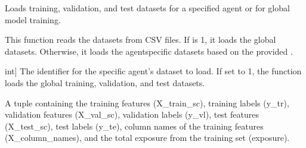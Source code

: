 \documentclass[letterpaper,10pt,english]{sphinxmanual}
\begin{document}

\begin{fulllineitems}
\label{\detokenize{utils:utils.load_individual_skorch_data}}
\pysigstartsignatures
{}
\pysigstopsignatures
\sphinxAtStartPar
Loads training, validation, and test datasets for a specified agent or for global model training.

\sphinxAtStartPar
This function reads the datasets from CSV files. If  is \sphinxhyphen{}1, it loads the global datasets.
Otherwise, it loads the agent\sphinxhyphen{}specific datasets based on the provided .
\begin{description}
\begin{description}
\sphinxlineitem{agent\_id}{[}int{]}
\sphinxAtStartPar
The identifier for the specific agent’s dataset to load. If set to \sphinxhyphen{}1, the function loads the
global training, validation, and test datasets.

\end{description}

\begin{description}
\sphinxAtStartPar
A tuple containing the training features (X\_train\_sc), training labels (y\_tr), validation features
(X\_val\_sc), validation labels (y\_vl), test features (X\_test\_sc), test labels (y\_te), column names
of the training features (X\_column\_names), and the total exposure from the training set (exposure).

\end{description}

\begin{sphinxVerbatim}[commandchars=\\\{\}]
         
\end{sphinxVerbatim}

\end{description}

\end{fulllineitems}
\end{document}
